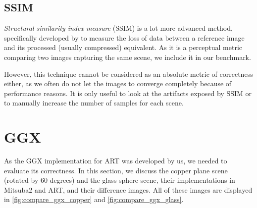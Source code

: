 \subsection{SSIM}
\emph{Structural similarity index measure} (SSIM) is a lot more advanced method, specifically developed by \citet{wang2004image} to measure the loss of data between a reference image and its processed (usually compressed) equivalent. As it is a perceptual metric comparing two images capturing the same scene, we include it in our benchmark.

However, this technique cannot be considered as an absolute metric of correctness either, as we often do not let the images to converge completely because of performance reasons. It is only useful to look at the artifacts exposed by SSIM or to manually increase the number of samples for each scene. 

\section{GGX}

As the GGX implementation for ART was developed by us, we needed to evaluate its correctness. In this section, we discuss the copper plane scene (rotated by 60 degrees) and the glass sphere scene, their implementations in Mitsuba2 and ART, and their difference images. All of these images are displayed in \autoref{fig:compare_ggx_copper} and \autoref{fig:compare_ggx_glass}.

